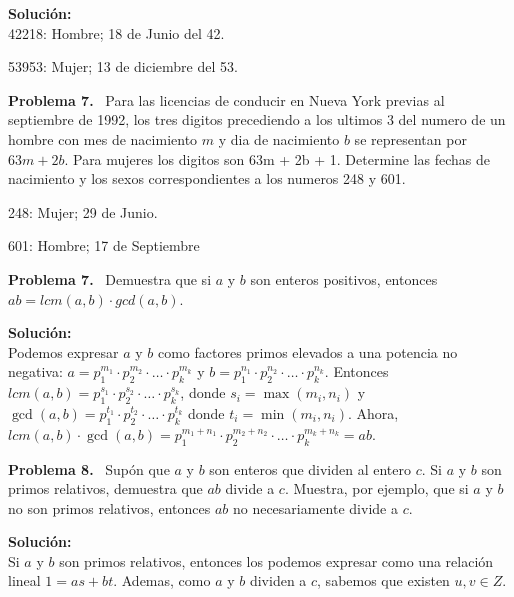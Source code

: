 \documentclass{article}
\newcounter{problem}
\newcounter{solution}
\newcommand\Problem[1]{%
  \stepcounter{problem}%
  \textbf{Problema #1.}~%
  \setcounter{solution}{0}%
}
\newcommand\TheSolution{%
  \textbf{Solución:}\\%
}
\begin{document}
\TheSolution{}
42218: Hombre; 18 de Junio del 42.

53953: Mujer; 13 de diciembre del 53.

\Problem{7} Para las licencias de conducir en Nueva York previas al septiembre
de 1992, los tres digitos precediendo a los ultimos 3 del numero de un hombre
con mes de nacimiento $m$ y dia de nacimiento $b$ se representan por $63m + 2b$.
Para mujeres los digitos son 63m + 2b + 1. Determine las fechas de nacimiento y
los sexos correspondientes a los numeros 248 y 601.

248: Mujer; 29 de Junio.

601: Hombre; 17 de Septiembre

\Problem{7} Demuestra que si $a$ y $b$ son enteros positivos, entonces $ab =
lcm(a, b)\cdot gcd(a, b)$.

\TheSolution{} Podemos expresar $a$ y $b$ como factores primos elevados a una
potencia no negativa: $a = p_1^{m_1}\cdot p_2^{m_2}\cdot \ldots\cdot p_k^{m_k}$
y $b = p_1^{n_1}\cdot p_2^{n_2}\cdot \ldots\cdot p_k^{n_k}$. Entonces $lcm(a, b) =
p_1^{s_1}\cdot p_2^{s_2}\cdot \ldots\cdot p_k^{s_k}$, donde $s_i = \max(m_i,
n_i)$ y $\gcd(a, b) = p_1^{t_1}\cdot p_2^{t_2}\cdot \ldots\cdot p_k^{t_k}$ donde
$t_i = \min(m_i, n_i)$. Ahora, $lcm(a, b) \cdot \gcd(a, b) = p_1^{m_1 +
n_1}\cdot p_2^{m_2 + n_2}\cdot \ldots\cdot p_k^{m_k + n_k} = ab$.

\Problem{8} Supón que $a$ y $b$ son enteros que dividen al entero $c$. Si $a$ y
$b$ son primos relativos, demuestra que $ab$ divide a $c$. Muestra, por ejemplo,
que si $a$ y $b$ no son primos relativos, entonces $ab$ no necesariamente divide
a $c$.

\TheSolution{}
Si $a$ y $b$ son primos relativos, entonces los podemos expresar como una
relación lineal $1 = as + bt$. Ademas, como $a$ y $b$ dividen a $c$, sabemos que
existen $u, v \in Z$.
\end{document}
